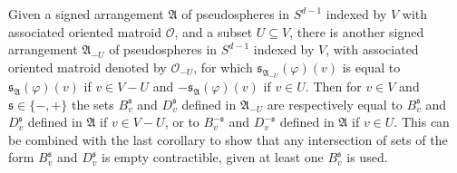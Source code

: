 \documentclass[10pt,a4paper]{amsart}
\begin{document}
\begin{remark}\label{rmk:reorientation}
    Given a signed arrangement $\mathfrak{A}$ of pseudospheres in $S^{d-1}$ indexed by $V$ with associated oriented matroid $\mathscr{O}$, and a subset $U\subseteq V$, there is another signed arrangement $\mathfrak{A}_{-U}$ of pseudospheres in $S^{d-1}$ indexed by $V$, with associated oriented matroid denoted by $\mathscr{O}_{-U}$, for which $\mathfrak{s}_{\mathfrak{A}_{-U}}(\varphi)(v)$ is equal to $\mathfrak{s}_\mathfrak{A}(\varphi)(v)$ if $v\in V-U$ and $-\mathfrak{s}_\mathfrak{A}(\varphi)(v)$ if $v\in U$. Then for $v\in V$ and $\mathfrak{s}\in\{-,+\}$ the sets $B^\mathfrak{s}_v$ and $D^\mathfrak{s}_v$ defined in $\mathfrak{A}_{-U}$ are respectively equal to $B^\mathfrak{s}_v$ and $D^\mathfrak{s}_v$ defined in $\mathfrak{A}$ if $v\in V-U$, or to $B^{-\mathfrak{s}}_v$ and $D^{-\mathfrak{s}}_v$ defined in $\mathfrak{A}$ if $v\in U$. This can be combined with the last corollary to show that any intersection of sets of the form $B^{\mathfrak{s}}_v$ and $D^\mathfrak{s}_v$ is empty contractible, given at least one $B^\mathfrak{s}_v$ is used.
\end{remark}
\end{document}
